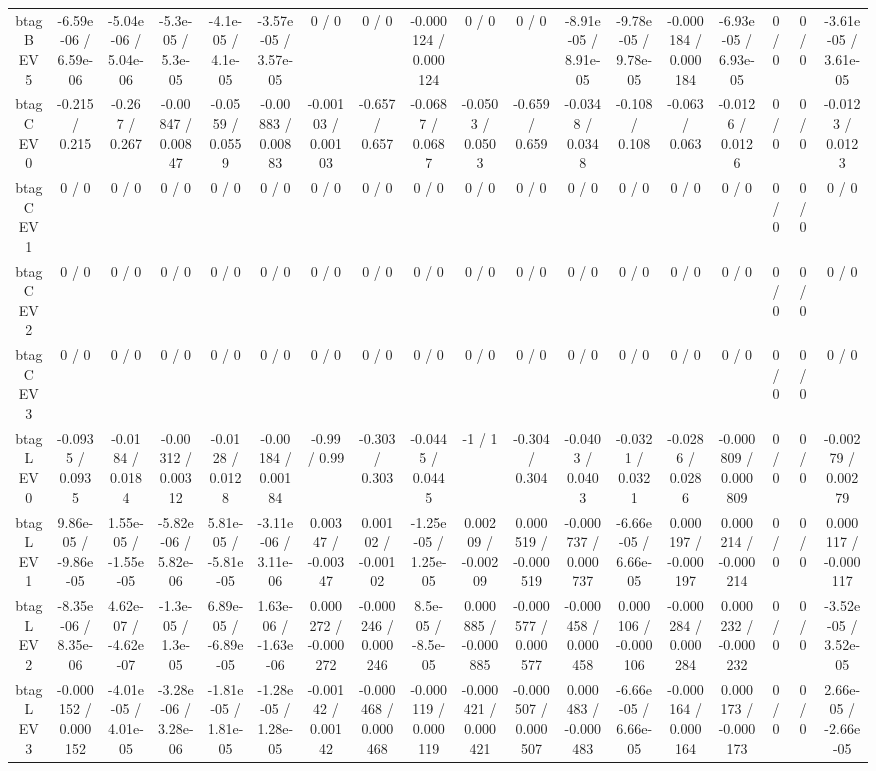 \documentclass[10pt]{article}
\begin{document}
\begin{table}[htbp]
\begin{center}
\begin{tabular}{|c|c|c|c|c|c|c|c|c|c|c|c|c|c|c|c|c|c|}
  btag B EV 5 & -6.59e-06 / 6.59e-06 & -5.04e-06 / 5.04e-06 & -5.3e-05 / 5.3e-05 & -4.1e-05 / 4.1e-05 & -3.57e-05 / 3.57e-05 & 0 / 0 & 0 / 0 & -0.000124 / 0.000124 & 0 / 0 & 0 / 0 & -8.91e-05 / 8.91e-05 & -9.78e-05 / 9.78e-05 & -0.000184 / 0.000184 & -6.93e-05 / 6.93e-05 & 0 / 0 & 0 / 0 & -3.61e-05 / 3.61e-05 \\ 
  btag C EV 0 & -0.215 / 0.215 & -0.267 / 0.267 & -0.00847 / 0.00847 & -0.0559 / 0.0559 & -0.00883 / 0.00883 & -0.00103 / 0.00103 & -0.657 / 0.657 & -0.0687 / 0.0687 & -0.0503 / 0.0503 & -0.659 / 0.659 & -0.0348 / 0.0348 & -0.108 / 0.108 & -0.063 / 0.063 & -0.0126 / 0.0126 & 0 / 0 & 0 / 0 & -0.0123 / 0.0123 \\ 
  btag C EV 1 & 0 / 0 & 0 / 0 & 0 / 0 & 0 / 0 & 0 / 0 & 0 / 0 & 0 / 0 & 0 / 0 & 0 / 0 & 0 / 0 & 0 / 0 & 0 / 0 & 0 / 0 & 0 / 0 & 0 / 0 & 0 / 0 & 0 / 0 \\ 
  btag C EV 2 & 0 / 0 & 0 / 0 & 0 / 0 & 0 / 0 & 0 / 0 & 0 / 0 & 0 / 0 & 0 / 0 & 0 / 0 & 0 / 0 & 0 / 0 & 0 / 0 & 0 / 0 & 0 / 0 & 0 / 0 & 0 / 0 & 0 / 0 \\ 
  btag C EV 3 & 0 / 0 & 0 / 0 & 0 / 0 & 0 / 0 & 0 / 0 & 0 / 0 & 0 / 0 & 0 / 0 & 0 / 0 & 0 / 0 & 0 / 0 & 0 / 0 & 0 / 0 & 0 / 0 & 0 / 0 & 0 / 0 & 0 / 0 \\ 
  btag L EV 0 & -0.0935 / 0.0935 & -0.0184 / 0.0184 & -0.00312 / 0.00312 & -0.0128 / 0.0128 & -0.00184 / 0.00184 & -0.99 / 0.99 & -0.303 / 0.303 & -0.0445 / 0.0445 & -1 / 1 & -0.304 / 0.304 & -0.0403 / 0.0403 & -0.0321 / 0.0321 & -0.0286 / 0.0286 & -0.000809 / 0.000809 & 0 / 0 & 0 / 0 & -0.00279 / 0.00279 \\ 
  btag L EV 1 & 9.86e-05 / -9.86e-05 & 1.55e-05 / -1.55e-05 & -5.82e-06 / 5.82e-06 & 5.81e-05 / -5.81e-05 & -3.11e-06 / 3.11e-06 & 0.00347 / -0.00347 & 0.00102 / -0.00102 & -1.25e-05 / 1.25e-05 & 0.00209 / -0.00209 & 0.000519 / -0.000519 & -0.000737 / 0.000737 & -6.66e-05 / 6.66e-05 & 0.000197 / -0.000197 & 0.000214 / -0.000214 & 0 / 0 & 0 / 0 & 0.000117 / -0.000117 \\ 
  btag L EV 2 & -8.35e-06 / 8.35e-06 & 4.62e-07 / -4.62e-07 & -1.3e-05 / 1.3e-05 & 6.89e-05 / -6.89e-05 & 1.63e-06 / -1.63e-06 & 0.000272 / -0.000272 & -0.000246 / 0.000246 & 8.5e-05 / -8.5e-05 & 0.000885 / -0.000885 & -0.000577 / 0.000577 & -0.000458 / 0.000458 & 0.000106 / -0.000106 & -0.000284 / 0.000284 & 0.000232 / -0.000232 & 0 / 0 & 0 / 0 & -3.52e-05 / 3.52e-05 \\ 
  btag L EV 3 & -0.000152 / 0.000152 & -4.01e-05 / 4.01e-05 & -3.28e-06 / 3.28e-06 & -1.81e-05 / 1.81e-05 & -1.28e-05 / 1.28e-05 & -0.00142 / 0.00142 & -0.000468 / 0.000468 & -0.000119 / 0.000119 & -0.000421 / 0.000421 & -0.000507 / 0.000507 & 0.000483 / -0.000483 & -6.66e-05 / 6.66e-05 & -0.000164 / 0.000164 & 0.000173 / -0.000173 & 0 / 0 & 0 / 0 & 2.66e-05 / -2.66e-05 \\ 

\end{tabular}
\end{center}
\end{table}
\end{document}
